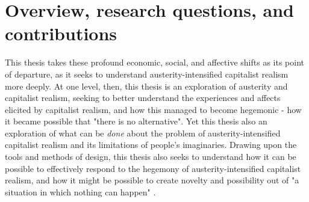 \section{Overview, research questions, and contributions}
This thesis takes these profound economic, social, and affective shifts as its point of departure, as it seeks to understand austerity-intensified capitalist realism more deeply. At one level, then, this thesis is an exploration of austerity and capitalist realism, seeking to better understand the experiences and affects elicited by capitalist realism, and how this managed to become hegemonic - how it became possible that "there is no alternative". Yet this thesis also an exploration of what can be \textit{done} about the problem of austerity-intensified capitalist realism and its limitations of people's imaginaries. Drawing upon the tools and methods of design, this thesis also seeks to understand how it can be possible to effectively respond to the hegemony of austerity-intensified capitalist realism, and how it might be possible to create novelty and possibility out of "a situation in which nothing can happen" \citep{fisher_capitalist_2009}.

